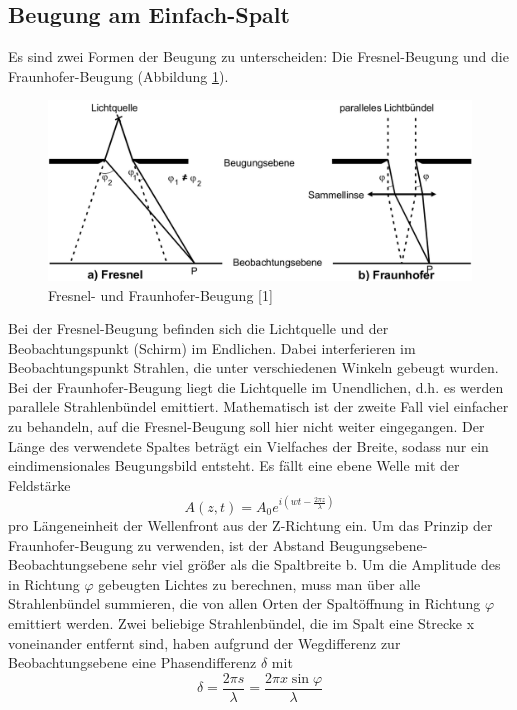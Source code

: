 \documentclass[11pt,ngerman,a4paper]{article}
\begin{document}
\subsection{Beugung am Einfach-Spalt}
Es sind zwei Formen der Beugung zu unterscheiden: Die Fresnel-Beugung und die Fraunhofer-Beugung (Abbildung \ref{abb1}).
\begin{figure}[H]
\centering
\includegraphics[scale=0.4]{abb1.png}
\caption{Fresnel- und Fraunhofer-Beugung [1]}
\label{abb1}
\end{figure}
\noindent
Bei der Fresnel-Beugung befinden sich die Lichtquelle und der Beobachtungspunkt (Schirm) im Endlichen. Dabei interferieren im Beobachtungspunkt Strahlen, die unter verschiedenen Winkeln gebeugt wurden. Bei der Fraunhofer-Beugung liegt die Lichtquelle im Unendlichen, d.h. es werden parallele Strahlenbündel emittiert. Mathematisch ist der zweite Fall viel einfacher zu behandeln, auf die Fresnel-Beugung soll hier nicht weiter eingegangen.
Der Länge des verwendete Spaltes beträgt ein Vielfaches der Breite, sodass nur ein eindimensionales Beugungsbild entsteht.
Es fällt eine ebene Welle mit der Feldstärke
\begin{equation}
A(z,t) = A_0 e^{i(wt- \frac{2\pi z}{ \lambda} )}
\end{equation}
pro Längeneinheit der Wellenfront aus der Z-Richtung ein.
Um das Prinzip der Fraunhofer-Beugung zu verwenden, ist der Abstand Beugungsebene-Beobachtungsebene sehr viel größer als die Spaltbreite b.\newline
Um die Amplitude des in Richtung $\varphi$ gebeugten Lichtes zu berechnen, muss man über alle Strahlenbündel summieren, die von allen Orten der Spaltöffnung in Richtung $\varphi$ emittiert werden. Zwei beliebige Strahlenbündel, die im Spalt eine Strecke x voneinander entfernt sind, haben aufgrund der Wegdifferenz zur Beobachtungsebene eine Phasendifferenz $\delta$ mit
\begin{equation}
\delta = \frac{2 \pi s}{\lambda} = \frac{2 \pi x \sin \varphi}{\lambda}
\end{equation}
\end{document}
